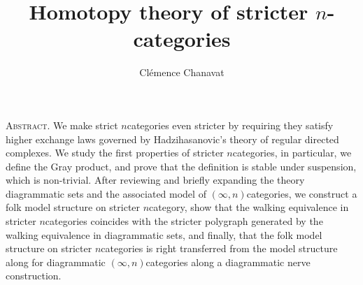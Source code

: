 \documentclass[11pt,twoside]{article}
\title{Homotopy theory of stricter $n$-categories}
\author{Cl\'emence Chanavat}
\begin{document}
\maketitle
\begin{center}
	\begin{minipage}[t]{.95\textwidth}
		\small\textsc{Abstract.}
		We make strict \( n \)\nbd categories even stricter by requiring they satisfy higher exchange laws governed by Hadzihasanovic's theory of regular directed complexes. 
		We study the first properties of stricter \( n \)\nbd categories, in particular, we define the Gray product, and prove that the definition is stable under suspension, which is non-trivial. 
		After reviewing and briefly expanding the theory diagrammatic sets and the associated model of \( (\infty, n) \)\nbd categories, we construct a folk model structure on stricter \( n \)\nbd category, show that the walking equivalence in stricter \( n \)\nbd categories coincides with the stricter polygraph generated by the walking equivalence in diagrammatic sets, and finally, that the folk model structure on stricter \( n \)\nbd categories is right transferred from the model structure along for diagrammatic \( (\infty, n) \)\nbd categories along a diagrammatic nerve construction.
	\end{minipage}
	
	\vspace{20pt}

	\begin{minipage}[t]{0.95\textwidth}
		\setcounter{tocdepth}{2}
		\tableofcontents
	\end{minipage}
\end{center}

\makeaftertitle








\small
\end{document}
